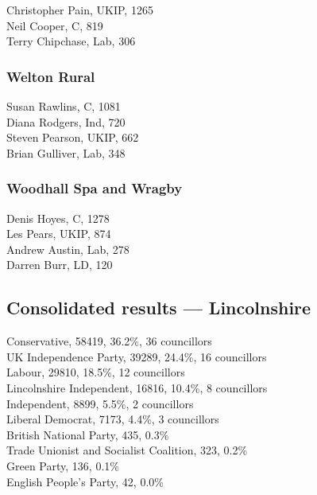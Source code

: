 \documentclass[a4paper,openany,10pt]{book}
\begin{document}


Christopher Pain, UKIP, 1265\\
Neil Cooper, C, 819\\
Terry Chipchase, Lab, 306\\


\subsubsection*{Welton Rural}



Susan Rawlins, C, 1081\\
Diana Rodgers, Ind, 720\\
Steven Pearson, UKIP, 662\\
Brian Gulliver, Lab, 348\\


\subsubsection*{Woodhall Spa and Wragby}



Denis Hoyes, C, 1278\\
Les Pears, UKIP, 874\\
Andrew Austin, Lab, 278\\
Darren Burr, LD, 120\\




\subsection*{Consolidated results --- Lincolnshire}
Conservative, 58419, 36.2\%, 36 councillors\\
UK Independence Party, 39289, 24.4\%, 16 councillors\\
Labour, 29810, 18.5\%, 12 councillors\\
Lincolnshire Independent, 16816, 10.4\%, 8 councillors\\
Independent, 8899, 5.5\%, 2 councillors\\
Liberal Democrat, 7173, 4.4\%, 3 councillors\\
British National Party, 435, 0.3\% \\
Trade Unionist and Socialist Coalition, 323, 0.2\% \\
Green Party, 136, 0.1\% \\
English People's Party, 42, 0.0\% \\
\end{document}
